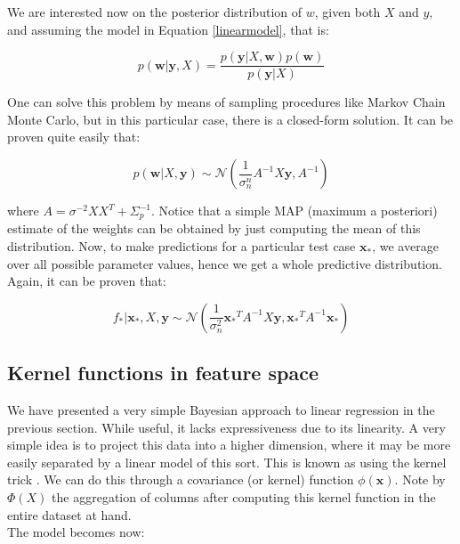 \documentclass[10pt,a4paper,twoside]{book}
\begin{document}
We are interested now on the posterior distribution of $w$, given both $X$ and $y$, and assuming the model in Equation \ref{linearmodel}, that is:

\begin{equation}
p(\boldsymbol{w}|\boldsymbol{y}, X) = \dfrac{p(\boldsymbol{y}|X, \boldsymbol{w}) p(\boldsymbol{w})}{p(\boldsymbol{y}| X)}
\end{equation}

One can solve this problem by means of sampling procedures like Markov Chain Monte Carlo, but in this particular case, there is a closed-form solution. It can be proven quite easily that:

\begin{equation}
p(\boldsymbol{w}|X, \boldsymbol{y}) \sim \mathcal{N} \left(\dfrac{1}{\sigma_n^n}A^{-1}X\boldsymbol{y}, A^{-1}\right)
\end{equation}

where $A = \sigma^{-2}XX^T + \Sigma_p^{-1}$. Notice that a simple MAP (maximum a posteriori) estimate of the weights can be obtained by just computing the mean of this distribution. Now, to make predictions for a particular test case $\boldsymbol{x_{*}}$, we average over all possible parameter values, hence we get a whole predictive distribution. Again, it can be proven that:

\begin{equation}
f_{*}|\boldsymbol{x_{*}}, X, \boldsymbol{y} \sim \mathcal{N}\left(\dfrac{1}{\sigma_n^2}\boldsymbol{x_{*}}^T A^{-1}X\boldsymbol{y}, \boldsymbol{x_*}^T A^{-1} \boldsymbol{x}_{*}\right)
\end{equation} 

\subsection{Kernel functions in feature space}

We have presented a very simple Bayesian approach to linear regression in the previous section. While useful, it lacks expressiveness due to its linearity. A very simple idea is to project this data into a higher dimension, where it may be more easily separated by a linear model of this sort. This is known as using the kernel trick \cite{Hofmann2008}. We can do this through a covariance (or kernel) function $\phi(\boldsymbol{x})$. Note by $\Phi(X)$ the aggregation of columns after computing this kernel function in the entire dataset at hand.\\

The model becomes now:
\end{document}
